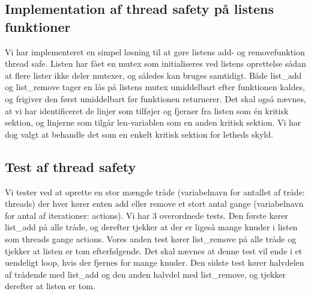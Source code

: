 \subsection{Implementation af thread safety på listens funktioner}
Vi har implementeret en simpel løsning til at gøre listens add- og removefunktion thread safe. Listen har fået en mutex som initialiseres ved listens oprettelse sådan at flere lister ikke deler mutexer, og således kan bruges samtidigt. Både list\_add og list\_remove tager en lås på listens mutex umiddelbart efter funktionen kaldes, og frigiver den først umiddelbart før funktionen returnerer. 
Det skal også nævnes, at vi har identificeret de linjer som tilføjer og fjerner fra listen som én kritisk sektion, og linjerne som tilgår len-variablen som en anden kritisk sektion. Vi har dog valgt at behandle det som en enkelt kritisk sektion for letheds skyld.

\subsection{Test af thread safety}
Vi tester ved at oprette en stor mængde tråde (variabelnavn for antallet af tråde: threads) der hver kører enten add eller remove et stort antal gange (variabelnavn for antal af iterationer: actions). 
Vi har 3 overordnede tests. 
Den første kører list\_add på alle tråde, og derefter tjekker at der er ligeså mange knuder i listen som threads gange actions.
Vores anden test kører list\_remove på alle tråde og tjekker at listen er tom efterfølgende. Det skal nævnes at denne test vil ende i et uendeligt loop, hvis der fjernes for mange knuder.
Den sidste test kører halvdelen af trådende med list\_add og den anden halvdel med list\_remove, og tjekker derefter at listen er tom. 

